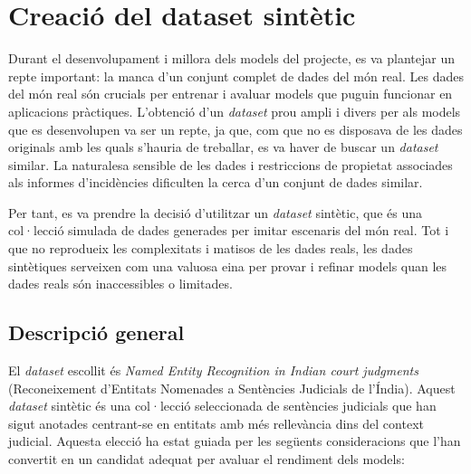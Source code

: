 \section{Creació del dataset sintètic}

Durant el desenvolupament i millora dels models del projecte, es va plantejar un repte important: la manca d'un conjunt complet de dades del món real. Les dades del món real són crucials per entrenar i avaluar models que puguin funcionar en aplicacions pràctiques. L'obtenció d'un \textit{dataset} prou ampli i divers per als models que es desenvolupen va ser un repte, ja que, com que no es disposava de les dades originals amb les quals s'hauria de treballar, es va haver de buscar un \textit{dataset} similar. La naturalesa sensible de les dades i restriccions de propietat associades als informes d'incidències dificulten la cerca d'un conjunt de dades similar.

Per tant, es va prendre la decisió d'utilitzar un \textit{dataset} sintètic, que és una col·lecció simulada de dades generades per imitar escenaris del món real. Tot i que no reprodueix les complexitats i matisos de les dades reals, les dades sintètiques serveixen com una valuosa eina per provar i refinar models quan les dades reals són inaccessibles o limitades.


\subsection{Descripció general}
El \textit{dataset} escollit és \textit{Named Entity Recognition in Indian court judgments} \cite{dataset} (Reconeixement d'Entitats Nomenades a Sentències Judicials de l'Índia). Aquest \textit{dataset} sintètic és una col·lecció seleccionada de sentències judicials que han sigut anotades centrant-se en entitats amb més rellevància dins del context judicial. Aquesta elecció ha estat guiada per les següents consideracions que l'han convertit en un candidat adequat per avaluar el rendiment dels models:


